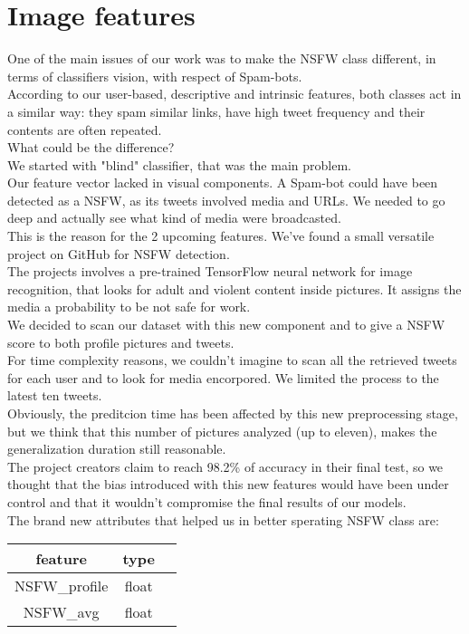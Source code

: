 \section{Image features}
One of the main issues of our work was to make the NSFW class different, in terms of classifiers vision, with respect of Spam-bots.\\
According to our user-based, descriptive and intrinsic features, both classes act in a similar way: they spam similar links, have high tweet frequency and their contents are often repeated.\\
What could be the difference?\\
We started with "blind" classifier, that was the main problem.\\ Our feature vector lacked in visual components. A Spam-bot could have been detected as a NSFW, as its tweets involved media and URLs. We needed to go deep and actually see what kind of media were broadcasted.\\
This is the reason for the 2 upcoming features. We've found a small versatile project on GitHub for NSFW detection.\\
The projects involves a pre-trained TensorFlow neural network for image recognition, that looks for adult and violent content inside pictures. It assigns the media a probability to be not safe for work.\\
We decided to scan our dataset with this new component and to give a NSFW score to both profile pictures and tweets.\\
For time complexity reasons, we couldn't imagine to scan all the retrieved tweets for each user and to look for media encorpored. We limited the process to the latest ten tweets.\\
Obviously, the preditcion time has been affected by this new preprocessing stage, but we think that this number of pictures analyzed (up to eleven), makes the generalization duration still reasonable.\\
The project creators claim to reach 98.2\% of accuracy in their final test, so we thought that the bias introduced with this new features would have been under control and that it wouldn't compromise the final results of our models.\\
The brand new attributes that helped us in better sperating NSFW class are:
\small
\begin{center}
	\begin{tabular}{ccc}
		\\feature&type\\
		\hline\hline
		NSFW\_profile&float\\
		NSFW\_avg&float\\\hline
	\end{tabular}
\end{center}
\normalsize